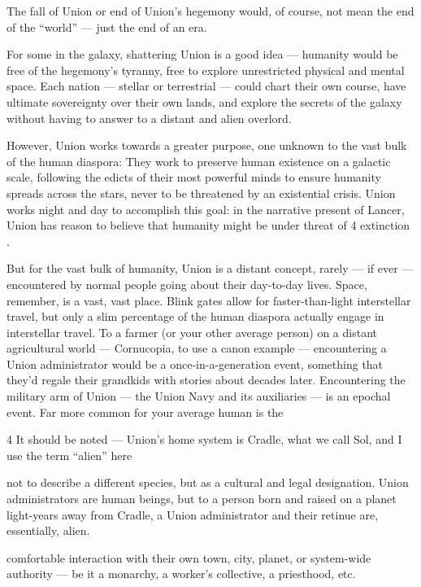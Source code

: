 The fall of Union or end of Union’s hegemony would, of course, not mean the end of the “world”  
— just the end of an era.
 

For some in the galaxy, shattering Union is a good idea — humanity would be free of the  
hegemony’s tyranny, free to explore unrestricted physical and mental space. Each nation —  
stellar or terrestrial — could chart their own course, have ultimate sovereignty over their own  
lands, and explore the secrets of the galaxy without having to answer to a distant and alien  
overlord.
 

However, Union works towards a greater purpose, one unknown to the vast bulk of the human  
diaspora: They work to preserve human existence on a galactic scale, following the edicts of  
their most powerful minds to ensure humanity spreads across the stars, never to be threatened  
by an existential crisis. Union works night and day to accomplish this goal: in the narrative  
present of Lancer, Union has reason to believe that humanity might be under threat of  
            4 
extinction  .  

But for the vast bulk of humanity, Union is a distant concept, rarely — if ever — encountered by  
normal people going about their day-to-day lives. Space, remember, is a vast, vast place. Blink  
gates allow for faster-than-light interstellar travel, but only a slim percentage of the human  
diaspora actually engage in interstellar travel. To a farmer (or your other average person) on a  
distant agricultural world — Cornucopia, to use a canon example — encountering a Union  
administrator would be a once-in-a-generation event, something that they’d regale their  
grandkids with stories about decades later. Encountering the military arm of Union — the Union  
Navy and its auxiliaries — is an epochal event. Far more common for your average human is the  

4 It should be noted — Union’s home system is Cradle, what we call Sol, and I use the term “alien” here  

not to describe a different species, but as a cultural and legal designation. Union administrators are human  
beings, but to a person born and raised on a planet light-years away from Cradle, a Union administrator  
and their retinue are, essentially, alien. 

                                                                                                                


comfortable interaction with their own town, city, planet, or system-wide authority — be it a  
monarchy, a worker’s collective, a priesthood, etc. 
 

